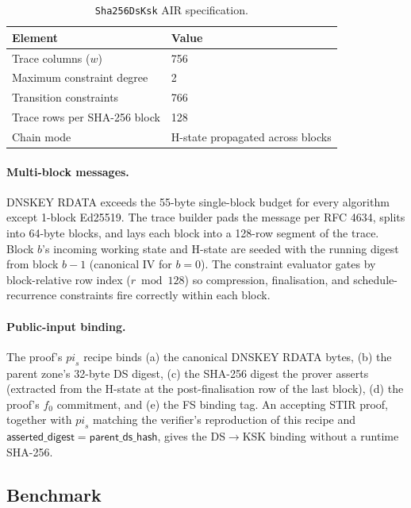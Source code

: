 \documentclass[11pt,a4paper]{article}
\theoremstyle{definition}
\theoremstyle{plain}
\begin{document}
\begin{table}[h]
\centering\small
\begin{tabular}{ll}
\toprule
Element & Value \\
\midrule
Trace columns ($w$) & 756 \\
Maximum constraint degree & 2 \\
Transition constraints & 766 \\
Trace rows per SHA-256 block & 128 \\
Chain mode & H-state propagated across blocks \\
\bottomrule
\end{tabular}
\caption{\texttt{Sha256DsKsk} AIR specification.}
\label{tab:sha256-air}
\end{table}

\paragraph{Multi-block messages.}  DNSKEY RDATA exceeds the 55-byte
single-block budget for every algorithm except 1-block Ed25519.  The
trace builder pads the message per RFC 4634, splits into 64-byte
blocks, and lays each block into a 128-row segment of the trace.
Block $b$'s incoming working state and H-state are seeded with the
running digest from block $b-1$ (canonical IV for $b = 0$).  The
constraint evaluator gates by block-relative row index ($r \bmod
128$) so compression, finalisation, and schedule-recurrence
constraints fire correctly within each block.

\paragraph{Public-input binding.}  The proof's $\mathit{pi}_s$
recipe binds (a) the canonical DNSKEY RDATA bytes, (b) the parent
zone's 32-byte DS digest, (c) the SHA-256 digest the prover asserts
(extracted from the H-state at the post-finalisation row of the
last block), (d) the proof's $f_0$ commitment, and (e) the FS
binding tag.  An accepting STIR proof, together with $\mathit{pi}_s$
matching the verifier's reproduction of this recipe and
$\mathsf{asserted\_digest} = \mathsf{parent\_ds\_hash}$, gives the
DS$\to$KSK binding without a runtime SHA-256.

\subsection{Benchmark}
\label{sec:dsksk-bench}
\end{document}
